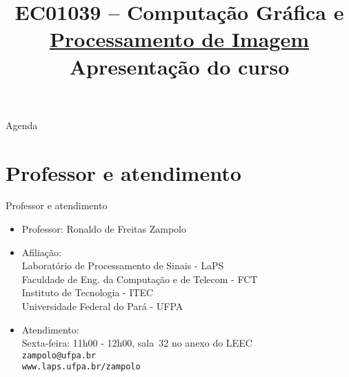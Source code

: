 


\title{\Large EC01039 -- Computação Gráfica e \underline{Processamento de Imagem}\\ \vspace{1cm}Apresentação do curso}


   \maketitle[randomdots={false}]
   \begin{slide}{Agenda}
      \tableofcontents[content=sections]
   \end{slide}

   \section[ slide = false ]{Professor e atendimento}
      \begin{slide}[toc=]{Professor e atendimento}
         \begin{itemize}[type=1]
            \item Professor: Ronaldo de Freitas Zampolo 
            \item Afiliação:\\
                  Laboratório de Processamento de Sinais - LaPS\\
                  Faculdade de Eng. da Computação e de Telecom - FCT\\
                  Instituto de Tecnologia - ITEC\\
                  Universidade Federal do Pará - UFPA %
            \item Atendimento:\\
                  Sexta-feira: 11h00 - 12h00, sala~32 no anexo do LEEC\\
                  \texttt{zampolo@ufpa.br}\\ 
                  \texttt{www.laps.ufpa.br/zampolo}
         \end{itemize}
      \end{slide}

